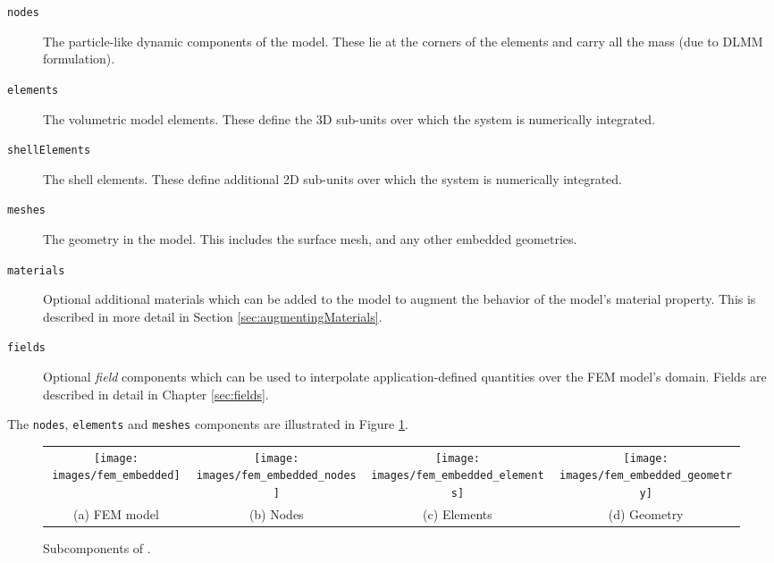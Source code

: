 \begin{description}
\item[{\tt nodes}]\mbox{}

The particle-like dynamic components of the model.  These lie at the corners
of the elements and carry all the mass (due to DLMM formulation).

\item[{\tt elements}]\mbox{}

The volumetric model elements. These define the 3D 
sub-units over which the system is numerically integrated.

\item[{\tt shellElements}]\mbox{}

The shell elements. These define additional 2D sub-units
over which the system is numerically integrated.

\item[{\tt meshes}]\mbox{}

The geometry in the model.  This includes the surface mesh, and any other
embedded geometries.

\item[{\tt materials}]\mbox{}

Optional additional materials which can be added to the
model to augment the behavior of the 
model's {\sf material} property. This is described in more detail
in Section \ref{sec:augmentingMaterials}.

\item[{\tt fields}]\mbox{}

Optional {\it field} components which can be used to interpolate
application-defined quantities over the FEM model's domain. Fields are
described in detail in Chapter \ref{sec:fields}.

\end{description}

The {\tt nodes}, {\tt elements} and {\tt meshes} components are
illustrated in Figure \ref{fig:fem}.

\begin{figure}[ht]
\centering
{}
\begin{tabular}{cccc}
\texttt{[image: images/fem\_embedded]} & 
\texttt{[image: images/fem\_embedded\_nodes]} &
\texttt{[image: images/fem\_embedded\_elements]} &
\texttt{[image: images/fem\_embedded\_geometry]}\\
(a) FEM model & (b) Nodes & (c) Elements & (d) Geometry
\end{tabular}
\caption{
Subcomponents of . 
\label{fig:fem}}
\end{figure}


